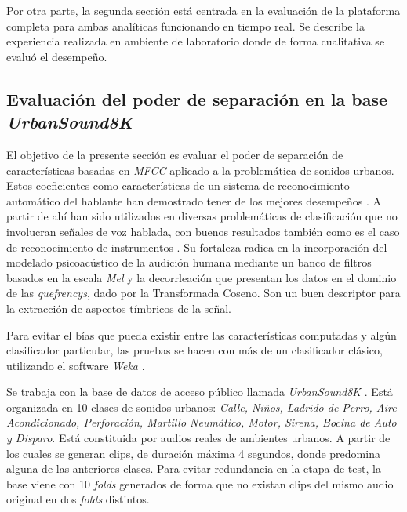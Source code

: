 \documentclass{article}
\begin{document}
\bigskip
Por otra parte, la segunda sección está centrada en la evaluación de la plataforma completa para ambas analíticas funcionando en tiempo real. Se describe la experiencia realizada en ambiente de laboratorio donde de forma cualitativa se evaluó el desempeño.

\subsection{Evaluación del poder de separación en la base \textit{UrbanSound8K}}
\label{poderseparacion}
El objetivo de la presente sección es evaluar el poder de separación de características basadas en \textit{MFCC} \citep{davis1980comparison} aplicado a la problemática de sonidos urbanos. Estos coeficientes como características de un sistema de reconocimiento automático del hablante han demostrado tener de los mejores desempeños \citep[Capítulo 14]{quatieri2002discrete}. A partir de ahí han sido utilizados en diversas problemáticas de clasificación que no involucran señales de voz hablada, con buenos resultados también como es el caso de reconocimiento de instrumentos \citep[Capítulo 6]{klapuri2007signal}. Su fortaleza radica en la incorporación del modelado psicoacústico de la audición humana mediante un banco de filtros basados en la escala \textit{Mel} \citep{stevens1937scale} y la decorrleación que presentan los datos en el dominio de las \textit{quefrencys}, dado por la Transformada Coseno. Son un buen descriptor para la extracción de aspectos tímbricos de la señal.

\bigskip
Para evitar el bías que pueda existir entre las características computadas y algún clasificador particular, las pruebas se hacen con más de un clasificador clásico, utilizando el software \textit{Weka} \citep{hall2009weka}.

\bigskip
Se trabaja con la base de datos de acceso público llamada \textit{UrbanSound8K} \citep{Salamon:UrbanSound:ACMMM:14}. Está organizada en 10 clases de sonidos urbanos: \textit{Calle, Niños, Ladrido de Perro, Aire Acondicionado, Perforación, Martillo Neumático, Motor, Sirena, Bocina de Auto y Disparo}. Está constituida por audios reales de ambientes urbanos. A partir de los cuales se generan clips, de duración máxima 4 segundos, donde predomina alguna de las anteriores clases. Para evitar redundancia en la etapa de test, la base viene con 10 \textit{folds} generados de forma que no existan clips del mismo audio original en dos \textit{folds} distintos.
\end{document}
